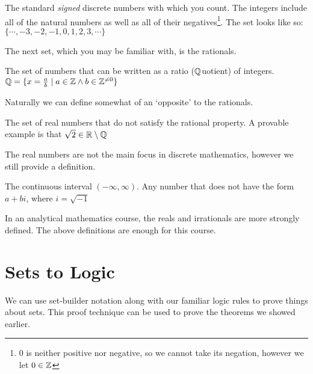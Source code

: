 \documentclass[main.tex]{subfiles}
\begin{document}
\begin{defn}
	The standard \textit{signed} discrete numbers with which you count. The integers include all of the natural numbers as well as all of their negatives\footnote{0 is neither positive nor negative, so we cannot take its negation, however we let \(0 \in \mathbb{Z}\)}. The set looks like so: \(\{\cdots,-3,-2,-1,0,1,2,3,\cdots\}\)
\end{defn}

The next set, which you may be familiar with, is the rationals.

\begin{defn}
	The set of numbers that can be written as a ratio (\(\mathbb{Q}\)uotient) of integers. \(\mathbb{Q} = \{x = \frac{a}{b} \mid a \in \mathbb{Z} \land b \in \mathbb{Z}^{\neq 0}\}\)
\end{defn}

Naturally we can define somewhat of an `opposite' to the rationals.

\begin{defn}
	The set of real numbers that do not satisfy the rational property. A provable example is that \(\sqrt{2} \in \mathbb{R} \setminus \mathbb{Q}\)
\end{defn}

The real numbers are not the main focus in discrete mathematics, however we still provide a definition.

\begin{defn}
	The continuous interval \((-\infty, \infty)\). Any number that does not have the form \(a+bi\), where \(i = \sqrt{-1}\)
\end{defn}

In an analytical mathematics course, the reals and irrationals are more strongly defined. The above definitions are enough for this course.

\section{Sets to Logic}

We can use set-builder notation along with our familiar logic rules to prove things about sets. This proof technique can be used to prove the theorems we showed earlier.

\end{document}
